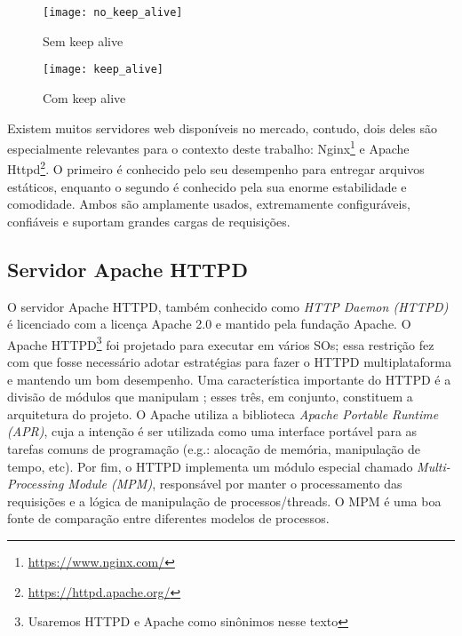 
\begin{figure}[!h]
  \centering
  \texttt{[image: no\_keep\_alive]}
  \caption{Sem keep alive}
  \label{fig:no_keep_alive}
\end{figure}

\begin{figure}[!h]
  \texttt{[image: keep\_alive]}
  \caption{Com keep alive}
  \label{fig:keep_alive}
\end{figure}

Existem muitos servidores web disponíveis no mercado, contudo, dois deles são
especialmente relevantes para o contexto deste trabalho:
Nginx\footnote{\url{https://www.nginx.com/}} e Apache
Httpd\footnote{\url{https://httpd.apache.org/}}.  O primeiro é conhecido pelo
seu desempenho para entregar arquivos estáticos, enquanto o segundo é conhecido
pela sua enorme estabilidade e comodidade. Ambos são amplamente usados, extremamente
configuráveis, confiáveis e suportam grandes cargas de requisições.

\subsection{Servidor Apache HTTPD}
\label{sec:architecture}

O servidor Apache HTTPD, também conhecido como \emph{HTTP Daemon (HTTPD)} é
licenciado com a licença Apache 2.0 e mantido pela fundação Apache.  O Apache
HTTPD\footnote{Usaremos HTTPD e Apache como sinônimos nesse texto} foi
projetado para executar em vários SOs; essa restrição fez com que fosse
necessário adotar estratégias para fazer o HTTPD multiplataforma e mantendo um
bom desempenho.  Uma característica importante do HTTPD é a divisão de módulos
que manipulam ; esses
três, em conjunto, constituem a arquitetura do projeto. O Apache utiliza
a biblioteca \emph{Apache Portable Runtime (APR)}, cuja a intenção é ser
utilizada como uma interface portável para as tarefas comuns de programação
(e.g.: alocação de memória, manipulação de tempo, etc). Por fim, o HTTPD
implementa um módulo especial chamado \emph{Multi-Processing Module (MPM)},
responsável por manter o processamento das requisições e a lógica de
manipulação de processos/threads. O MPM é uma boa fonte de comparação entre
diferentes modelos de processos.


